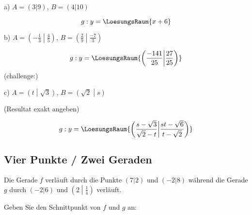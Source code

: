 a) $A = (3|9)$, $B=(4|10)$

\vspace{15mm}

$$g: y= \LoesungsRaum{x + 6}$$
\vspace{5mm}

b) $A = \left(-\frac13\middle|\frac45\right)$, $B=\left(\frac29\middle|\frac{-7}3\right)$

\vspace{15mm}

$$g: y= \LoesungsRaum{\left( \frac{-141}{25} \middle| \frac{27}{25}\right)}$$
\vspace{5mm}
\newpage
(challenge:)

\vspace{3mm}

c) $A = \left( t \middle| \sqrt{3} \right)$,
$B=\left( \sqrt{2} \middle| s \right)$

(Resultat exakt angeben)

\vspace{15mm}

$$g: y= \LoesungsRaum{\left( \frac{s-\sqrt{3}}{\sqrt{2}-t} \middle| \frac{st-\sqrt{6}}{t-\sqrt{2}}\right)}$$
\vspace{5mm}


\subsection{Vier Punkte / Zwei Geraden}
Die Gerade $f$ verläuft durch die Punkte $(7|2)$ und $(-2|8)$ während
die Gerade $g$ durch $(-2|6)$ und $\left(2\middle|\frac14\right)$
verläuft.

Geben Sie den Schnittpunkt von $f$ und $g$ an:

